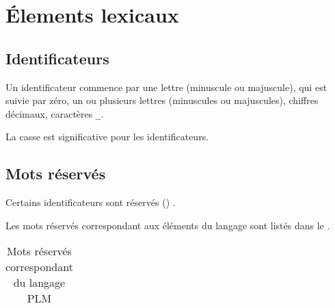 


\chapter{Élements lexicaux}

\thispagestyle{empty}





\section{Identificateurs}
Un identificateur commence par une lettre (minuscule ou majuscule), qui est suivie par zéro, un ou plusieurs lettres (minuscules ou majuscules), chiffres décimaux, caractères \texttt{\_}.

La casse est significative pour les identificateurs.





\section{Mots réservés}

Certains identificateurs sont réservés () .


Les mots réservés correspondant aux éléments du langage sont listés dans le .

\begin{table}[!t]
  \centering
  \begin{tabular}{llllll}
    
  \end{tabular}
  \caption{Mots réservés correspondant du langage PLM}
  \ligne
\end{table}







%
%
%



